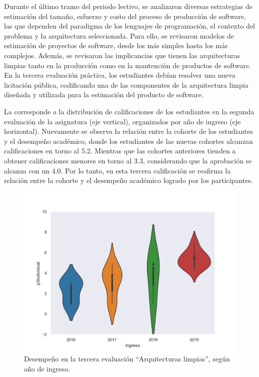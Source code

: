 \documentclass[spanish]{textolivre}
\begin{document}
Durante el último tramo del periodo lectivo, se analizaron diversas estrategias de estimación del tamaño, esfuerzo y costo del proceso de producción de software, las que dependen del paradigma de los lenguajes de programación, el contexto del problema y la arquitectura seleccionada. Para ello, se revisaron modelos de estimación de proyectos de software, desde los más simples hasta los más complejos. Además, se revisaron las implicancias que tienen las arquitecturas limpias tanto en la producción como en la mantención de productos de software. En la tercera evaluación práctica, los estudiantes debían resolver una nueva licitación pública, codificando una de las componentes de la arquitectura limpia diseñada y utilizada para la estimación del producto de software.

La  corresponde a la distribución de calificaciones de los estudiantes en la segunda evaluación de la asignatura (eje vertical), organizados por año de ingreso (eje horizontal). Nuevamente se observa la relación entre la cohorte de los estudiantes y el desempeño académico, donde los estudiantes de las nuevas cohortes alcanzan calificaciones en torno al 5.2. Mientras que las cohortes anteriores tienden a obtener calificaciones menores en torno al 3.3, considerando que la aprobación se alcanza con un 4.0. Por lo tanto, en esta tercera calificación se reafirma la relación entre la cohorte y el desempeño académico logrado por los participantes.

\begin{figure}[H]
\centering
\begin{minipage}{.9\textwidth}
 \includegraphics[width=.8\textwidth]{figuras/figura4.png}
 \caption{Desempeño en la tercera evaluación “Arquitecturas limpias”, según año de ingreso.}
 \label{fig-eval3}
\end{minipage}
\end{figure}
\end{document}
